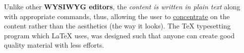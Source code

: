 \documentclass{article}
\begin{document}
	Unlike other \textbf{WYSIWYG editors}, the \emph{content is written in plain text} along with appropriate commands, thus, allowing the user to \underline{concentrate} on the content rather than the aesthetics (the way it looks). The {\Large TeX} typesetting program which LaTeX uses, was designed such that anyone can create good quality {\footnotesize material with less efforts.}
	
	\tiny
	\lipsum[1-2]
	
	\normalsize
	\lipsum[3-4]
    
\end{document}

